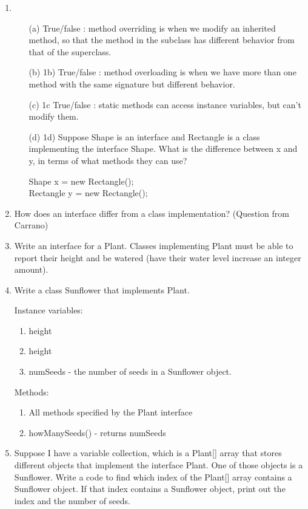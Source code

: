 \documentclass[letter]{article}
\def\coursename{CS 201: Data Structures}
\newcommand{\header}[1]{%
	\begin{center}
		\fbox{
			\begin{minipage}{6in}
				\textbf{\coursename} \hfill       \\
				\textit{#1} \hfill \textit{\today}
			\end{minipage}
		}
	\end{center}
	\vspace*{4mm}
}
\begin{document}
\header{Week 2}

\begin{enumerate} [1.]
    \item 
    \begin{itemize}
        \item [(a)] True/false : method overriding is when we modify an inherited method, so that the method in the subclass has different behavior from that of the superclass. 
        \item [(b)] 1b) True/false : method overloading is when we have more than one method with the same signature but different behavior. 
        \item [(c)] 1c True/false : static methods can access instance variables, but can’t modify them. 
        \item [(d)] 1d) Suppose Shape is an interface and Rectangle is a class implementing the interface Shape. What is the difference between x and y, in terms of what methods they can use?
        
        
        Shape x = new Rectangle();\\
        Rectangle y = new Rectangle();
    \end{itemize}

    \item How does an interface differ from a class implementation? (Question from Carrano)

    \item Write an interface for a Plant. Classes implementing Plant must be able to report their height and be watered (have their water level increase an integer amount).


    \item Write a class Sunflower that implements Plant. 
    
    Instance variables:
    \begin{enumerate}
        \item height
        \item height
        \item numSeeds - the number of seeds in a Sunflower object.
    \end{enumerate}
    
    Methods:
    \begin{enumerate}
        \item All methods specified by the Plant interface
        \item howManySeeds() - returns numSeeds
    \end{enumerate}
    
    \item Suppose I have a variable collection, which is a Plant[] array that stores different objects that implement the interface Plant. One of those objects is a Sunflower. Write a code to find which index of the Plant[] array contains a Sunflower object. If that index contains a Sunflower object, print out the index and the number of seeds.

    
\end{enumerate}
\end{document}
